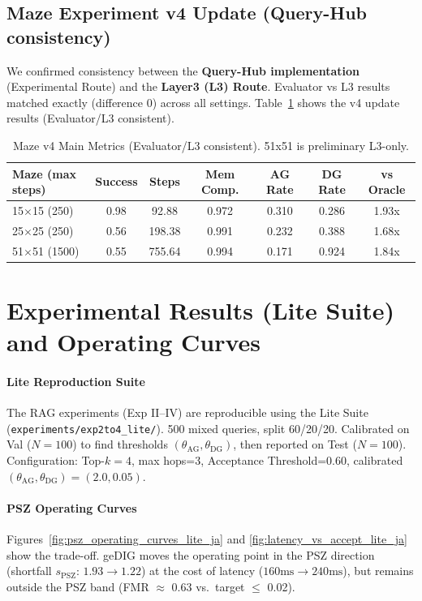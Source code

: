 \documentclass[12pt]{article}
\begin{document}
\subsection{Maze Experiment v4 Update (Query-Hub consistency)}\label{sec:maze_v4_update}
We confirmed consistency between the \textbf{Query-Hub implementation} (Experimental Route) and the \textbf{Layer3 (L3) Route}.
Evaluator vs L3 results matched exactly (difference 0) across all settings.
Table~\ref{tab:maze_v4_main} shows the v4 update results (Evaluator/L3 consistent).
\begin{table}[H]
    \centering
    \caption{Maze v4 Main Metrics (Evaluator/L3 consistent). 51x51 is preliminary L3-only.}
    \label{tab:maze_v4_main}
    \small
    \begin{tabular}{lcccccc}
    \toprule
    Maze (max steps) & Success & Steps & Mem Comp. & AG Rate & DG Rate & vs Oracle \\
    \midrule
    15$\times$15 (250) & 0.98 & 92.88 & 0.972 & 0.310 & 0.286 & 1.93x \\
    25$\times$25 (250) & 0.56 & 198.38 & 0.991 & 0.232 & 0.388 & 1.68x \\
    51$\times$51 (1500) & 0.55 & 755.64 & 0.994 & 0.171 & 0.924 & 1.84x \\
    \bottomrule
    \end{tabular}
\end{table}

\section{Experimental Results (Lite Suite) and Operating Curves}\label{sec:exp_results_lite}
\paragraph{Lite Reproduction Suite}\; The RAG experiments (Exp II--IV) are reproducible using the Lite Suite (\texttt{experiments/exp2to4\_lite/}).
500 mixed queries, split 60/20/20. Calibrated on Val ($N=100$) to find thresholds $(\theta_{\mathrm{AG}},\theta_{\mathrm{DG}})$, then reported on Test ($N=100$).
Configuration: Top-$k=4$, max hops=3, Acceptance Threshold=0.60, calibrated $(\theta_{\mathrm{AG}},\theta_{\mathrm{DG}})=(2.0, 0.05)$.

\paragraph{PSZ Operating Curves}\;
Figures~\ref{fig:psz_operating_curves_lite_ja} and \ref{fig:latency_vs_accept_lite_ja} show the trade-off.
geDIG moves the operating point in the PSZ direction (shortfall $s_{\mathrm{PSZ}}$: $1.93\to1.22$) at the cost of latency ($160\mathrm{ms} \to 240\mathrm{ms}$), but remains outside the PSZ band (FMR $\approx$ 0.63 vs.\ target $\le$ 0.02).
\end{document}
